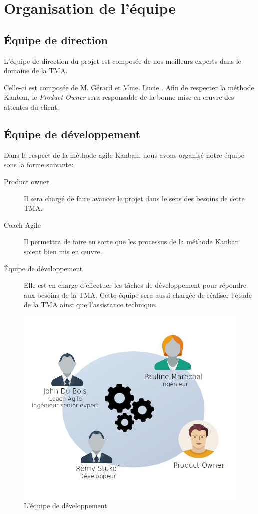 \section{Organisation de l'équipe}
	\subsection{Équipe de direction}
	L’équipe de direction du projet est composée de nos meilleurs experts dans le domaine de la TMA. 

	Celle-ci est composée de M. Gérard  et Mme. Lucie . Afin de respecter la méthode Kanban, le \textit{Product Owner} sera responsable de la bonne mise en œuvre des attentes du client.
	
	\subsection{Équipe de développement}
	Dans le respect de la méthode agile Kanban, nous avons organisé notre équipe sous la forme suivante:
	
	\begin{description}
		\item[Product owner]  Il sera chargé de faire avancer le projet dans le sens des besoins de cette TMA.
		\item[Coach Agile]  Il permettra de faire en sorte que les processus de la méthode Kanban soient bien mis en œuvre. 
		\item[Équipe de développement] Elle est en charge d’effectuer les tâches de développement pour répondre aux besoins de la TMA. Cette équipe sera aussi chargée de réaliser l’étude de la TMA ainsi que l’assistance technique. 		
	\end{description}
		
\begin{figure}[H]
\centering
\includegraphics[width=0.7\linewidth]{images/chap2/team}
\caption{L'équipe de développement}
\label{fig:team}
\end{figure}
